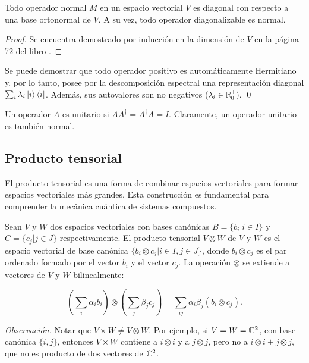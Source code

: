 \begin{teorema}
Todo operador normal $M$ en un espacio vectorial $V$ es diagonal con respecto a una base ortonormal de $V$. A su vez, todo operador diagonalizable es normal.
\end{teorema}
\begin{proof}
    Se encuentra demostrado por inducción en la dimensión de $V$ en la página 72 del libro \cite{purification}.
\end{proof}

\begin{teorema}\label{teo:descomposicion}
Se puede demostrar que todo operador positivo es automáticamente Hermitiano y, por lo tanto, posee por la descomposición espectral una representación diagonal $\sum_i \lambda_i\ket{i}\bra{i}$. Además, sus autovalores son no negativos ($\lambda_i \in \mathbb{R}_0^+$).
\qed
\end{teorema}

\begin{definicion}
Un operador $A$ es unitario si $AA^\dagger = A^\dagger A = I$. Claramente, un operador unitario es también normal. 
\end{definicion}

\subsection{Producto tensorial}
El producto tensorial es una forma de combinar espacios vectoriales para formar espacios vectoriales más grandes. Esta construcción es fundamental para comprender la mecánica cuántica de sistemas compuestos.

Sean $V$ y $W$ dos espacios vectoriales con bases canónicas $B = \{b_i | i \in I\}$ y $C = \{c_j | j \in J\}$ respectivamente. El producto tensorial $V\otimes W$ de $V$ y $W$ es el espacio vectorial de base canónica \(\{b_i\otimes c_j |i\in
 I, j \in J \}\), donde $b_i \otimes c_j$ es el par ordenado formado por el vector $b_i$ y el vector $c_j$. La operación $\otimes$ se extiende a vectores de $V$ y $W$ bilinealmente:

\begin{equation}
(\sum_i \alpha_i b_i ) \otimes (\sum_j \beta_j c_j) = \sum_{ij} \alpha_i \beta_j (b_i \otimes c_j).
\end{equation}

\textit{Observación.} Notar que $V \times W \neq V\otimes W$. Por ejemplo, si $V = W = \mathbb{C}^2$, con base canónica $\{i,j\}$, entonces $V\times W$ contiene  a $i\otimes i$ y a $j\otimes j$, pero no a $i\otimes i+j\otimes j$, que no es producto de dos vectores de $\mathbb{C}^2$.

